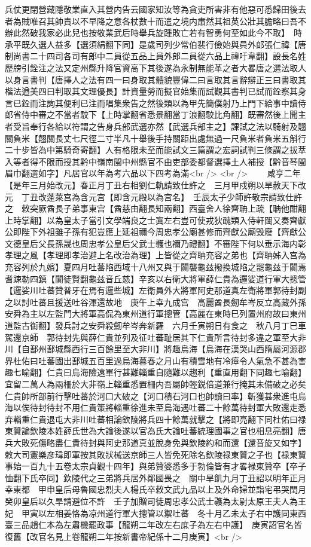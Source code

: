 兵仗更閉營藏隱敬業直入其營内告云國家知汝等為貪吏所害非有他惡可悉歸田後去者為賊唯召其帥責以不早降之意各杖數十而遣之境内肅然其祖英公壯其膽略曰吾不辦此然破我家必此兒也按敬業武后時舉兵旋踵敗亡若有智勇何至如此今不取】　時承平既久選人益多【選須絹翻下同】是歲司列少常伯裴行儉始與員外郎張仁禕【唐制尚書二十四司各司有郎中二員從五品上員外郎二員從六品上禕吁韋翻】設長名姓歷牓引銓注之法又定州縣升降官資高下其後遂為永制無能革之者大畧唐之選法取人以身言書判【唐擇人之法有四一曰身取其體貌豐偉二曰言取其言辭辯正三曰書取其楷法遒美四曰判取其文理優長】計資量勞而擬官始集而試觀其書判已試而銓察其身言已銓而注詢其便利已注而唱集衆告之然後類以為甲先簡僕射乃上門下給事中讀侍郎省侍中審之不當者駮下【上時掌翻省悉景翻當丁浪翻駮比角翻】既審然後上聞主者受旨奉行各給以符謂之告身兵部武選亦然【武選兵部主之】課試之法以騎射及翹關負米【翹關長丈七尺徑二寸半凡十舉後手持關距出處無過一尺負米者負米五斛行二十步皆為中第騎奇寄翻】人有格限未至而能試文三篇謂之宏詞試判三條謂之拔萃入等者得不限而授其黔中嶺南閩中州縣官不由吏部委都督選擇土人補授【黔音琴閩眉巾翻選如字】凡居官以年為考六品以下四考為滿<br />
<br />
　　咸亨二年【是年三月始改元】春正月丁丑右相劉仁軌請致仕許之　三月甲戍朔以旱赦天下改元　丁丑改蓬萊宫為含元宫【即含元殿以為宫名】　壬辰太子少師許敬宗請致仕許之　敕突厥酋長子弟事東宫【酋慈由翻長知兩翻】西臺舍人徐齊聃上疏【聃他酣翻上時掌翻】以為皇太子當引文學端良之士寘左右豈可使戎狄醜類入侍軒闥又奏齊獻公即陛下外祖雖子孫有犯豈應上延祖禰今周忠孝公廟甚修而齊獻公廟毁廢【齊獻公文德皇后父長孫晟也周忠孝公皇后父武士彠也襧乃禮翻】不審陛下何以垂示海内彰孝理之風【孝理即孝治避上名改治為理】上皆從之齊聃充容之弟也【齊聃姊入宫為充容列於九嬪】夏四月吐蕃陷西域十八州又與于闐襲龜兹撥換城陷之罷龜兹于闐焉耆踈勒四鎮【闐徒賢翻龜兹音丘慈】辛亥以右衛大將軍薛仁貴為邏娑道行軍大摠管【邏娑川吐蕃贊普牙在焉有邏些城】左衛員外大將軍阿史那道真左衛將軍郭待封副之以討吐蕃且援送吐谷渾還故地　庚午上幸九成宫　高麗酋長劒牟岑反立高藏外孫安舜為主以左監門大將軍高侃為東州道行軍摠管【高麗在東時巳列置州府故曰東州道監古衘翻】發兵討之安舜殺劒牟岑奔新羅　六月壬寅朔日有食之　秋八月丁巳車駕還京師　郭待封先與薛仁貴並列及征吐蕃耻居其下仁貴所言待封多違之軍至大非川【自鄯州鄯城縣西行三百餘里至大非川】將趣烏海【烏海在漢哭山西隋屬河源郡界杜佑曰吐蕃國出鄯城五百里過烏海暮春之月山有積雪地有冷瘴令人氣急不甚為害趣七喻翻】仁貴曰烏海險遠軍行甚難輜重自隨難以趨利【重直用翻下同趣七喻翻】宜留二萬人為兩柵於大非嶺上輜重悉置柵内吾屬帥輕鋭倍道兼行掩其未備破之必矣仁貴帥所部前行擊吐蕃於河口大破之【河口積石河口也帥讀曰率】斬獲甚衆進屯烏海以俟待封待封不用仁貴策將輜重徐進未至烏海遇吐蕃二十餘萬待封軍大敗還走悉弃輜重仁貴退屯大非川吐蕃相論欽陵將兵四十餘萬就擊之【將即亮翻下同杜佑曰禄東贊論欽陵本姓薛氏世為大論後遂以官為氏大論吐蕃統理國事之官也相息亮翻】唐兵大敗死傷略盡仁貴待封與阿史那道真並脫身免與欽陵約和而還【還音旋又如字】敕大司憲樂彦瑋即軍按其敗狀械送京師三人皆免死除名欽陵禄東贊之子也【禄東贊事始一百九十五卷太宗貞觀十四年】與弟贊婆悉多于勃倫皆有才畧禄東贊卒【卒子恤翻下氏卒同】欽陵代之三弟將兵居外鄰國畏之　關中旱飢九月丁丑詔以明年正月幸東都　甲申皇后母魯國忠烈夫人楊氏卒敕文武九品以上及外命婦並詣宅弔哭閏月癸卯皇后以久旱請避位不許　壬子加贈司徒周忠孝公武士彠為太尉太原王夫人為王妃　甲寅以左相姜恪為凉州道行軍大摠管以禦吐蕃　冬十月乙未太子右中護同東西臺三品趙仁本為左肅機罷政事【龍朔二年改左右庶子為左右中護】　庚寅詔官名皆復舊【改官名見上卷龍朔二年按新書帝紀係十二月庚寅】<br />
